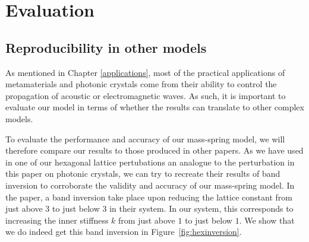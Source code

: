 \chapter{Evaluation}
\section{Reproducibility in other models}
\label{reproduce}
As mentioned in Chapter \ref{applications}, most of the practical applications
of metamaterials and photonic crystals come from their ability to control the
propagation of acoustic or electromagnetic waves. As such, it is important to
evaluate our model in terms of whether the results can translate to other
complex models.

To evaluate the performance and accuracy of our mass-spring model, we will
therefore compare our results to those produced in other papers. As we have
used in one of our hexagonal lattice pertubations an analogue to the
perturbation in this paper on photonic crystals,\cite{wuandhu} we can try to
recreate their results of band inversion to corroborate the validity and
accuracy of our mass-spring model. In the paper, a band inversion take place
upon reducing the lattice constant from just above $3$ to just below $3$ in
their system. In our system, this corresponds to increasing the inner stiffness
$k$ from just above $1$ to just below $1$. We show that we do indeed get this
band inversion in Figure~\ref{fig:hexinversion}.

